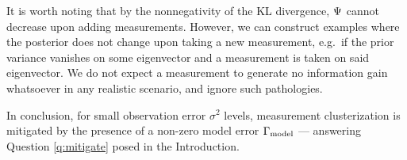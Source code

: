 It is worth noting that by the nonnegativity of the KL divergence,
$\Psi$ cannot decrease upon adding measurements. However, we can
construct examples where the posterior does not change upon taking a
new measurement, e.g.~if the prior variance vanishes on some
eigenvector and a measurement is taken on said eigenvector. We do not
expect a measurement to generate no information gain whatsoever in any
realistic scenario, and ignore such pathologies.

In conclusion, for small observation error $\sigma^2$ levels,
measurement clusterization is mitigated by the presence of a non-zero
model error $\Gamma_{\textup{model}}$ --- answering Question \ref{q:mitigate} posed in
the Introduction.%

